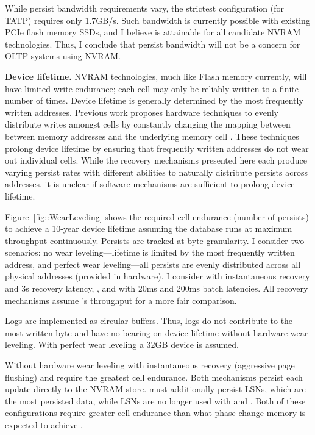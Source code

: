 While persist bandwidth requirements vary, the strictest configuration (\NVDisk for TATP) requires only 1.7GB/s.
Such bandwidth is currently possible with existing PCIe flash memory SSDs, and I believe is attainable for all candidate NVRAM technologies.
Thus, I conclude that persist bandwidth will not be a concern for OLTP systems using NVRAM.

\textbf{Device lifetime.}
NVRAM technologies, much like Flash memory currently, will have limited write endurance; each cell may only be reliably written to a finite number of times.
Device lifetime is generally determined by the most frequently written addresses.
Previous work proposes hardware techniques to evenly distribute writes amongst cells by constantly changing the mapping between between memory addresses and the underlying memory cell \cite{QureshiKaridis09}.
These techniques prolong device lifetime by ensuring that frequently written addresses do not wear out individual cells.
While the recovery mechanisms presented here each produce varying persist rates with different abilities to naturally distribute persists across addresses, it is unclear if software mechanisms are sufficient to prolong device lifetime.


Figure~\ref{fig::WearLeveling} shows the required cell endurance (number of persists) to achieve a 10-year device lifetime assuming the database runs at maximum throughput continuously.
Persists are tracked at byte granularity.
I consider two scenarios: no wear leveling---lifetime is limited by the most frequently written address, and perfect wear leveling---all persists are evenly distributed across all physical addresses (provided in hardware).
I consider \NVDisk with instantaneous recovery and 3s recovery latency, \InPlace, and \GroupCommit with 20ms and 200ms batch latencies.
All recovery mechanisms assume \InPlace's throughput for a more fair comparison.

Logs are implemented as circular buffers.
Thus, logs do not contribute to the most written byte and have no bearing on device lifetime without hardware wear leveling.
With perfect wear leveling a 32GB device is assumed.

Without hardware wear leveling \NVDisk with instantaneous recovery (aggressive page flushing) and \InPlace require the greatest cell endurance.
Both mechanisms persist each update directly to the NVRAM store.
\NVDisk must additionally persist LSNs, which are the most persisted data, while LSNs are no longer used with \InPlace and \GroupCommit.
Both of these configurations require greater cell endurance than what phase change memory is expected to achieve .

